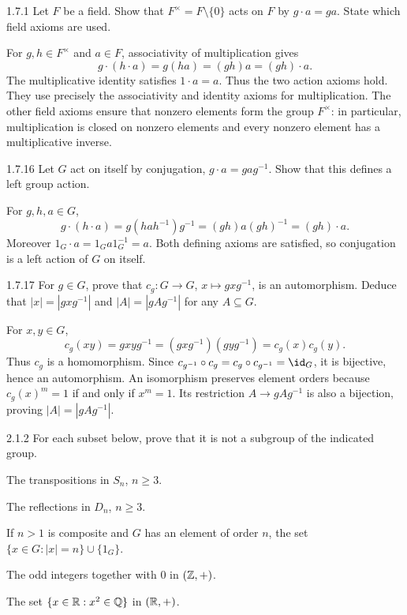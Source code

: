 \documentclass[11pt,oneside]{article}
\begin{document}

\begin{exercise}{1.7.1}
Let $F$ be a field. Show that $F^\times=F\setminus\{0\}$ acts on $F$ by $g\cdot a=ga$. State which field axioms are used.
\end{exercise}

\begin{solution}
For $g,h\in F^\times$ and $a\in F$, associativity of multiplication gives
\[
 g\cdot(h\cdot a)=g(ha)=(gh)a=(gh)\cdot a.
\]
The multiplicative identity satisfies $1\cdot a=a$. Thus the two action axioms hold. They use precisely the associativity and identity axioms for multiplication. The other field axioms ensure that nonzero elements form the group $F^\times$: in particular, multiplication is closed on nonzero elements and every nonzero element has a multiplicative inverse.
\end{solution}

\begin{exercise}{1.7.16}
Let $G$ act on itself by conjugation, $g\cdot a=gag^{-1}$. Show that this defines a left group action.
\end{exercise}

\begin{solution}
For $g,h,a\in G$,
\[
 g\cdot(h\cdot a)=g(hah^{-1})g^{-1}=(gh)a(gh)^{-1}=(gh)\cdot a.
\]
Moreover $1_G\cdot a=1_Ga1_G^{-1}=a$. Both defining axioms are satisfied, so conjugation is a left action of $G$ on itself.
\end{solution}

\begin{exercise}{1.7.17}
For $g\in G$, prove that $c_g:G\to G$, $x\mapsto gxg^{-1}$, is an automorphism. Deduce that $|x|=|gxg^{-1}|$ and $|A|=|gAg^{-1}|$ for any $A\subseteq G$.
\end{exercise}

\begin{solution}
For $x,y\in G$,
\[
 c_g(xy)=gxyg^{-1}=(gxg^{-1})(gyg^{-1})=c_g(x)c_g(y).
\]
Thus $c_g$ is a homomorphism. Since $c_{g^{-1}}\circ c_g=c_g\circ c_{g^{-1}}=\id_G$, it is bijective, hence an automorphism. An isomorphism preserves element orders because $c_g(x)^m=1$ if and only if $x^m=1$. Its restriction $A\to gAg^{-1}$ is also a bijection, proving $|A|=|gAg^{-1}|$.
\end{solution}

\begin{exercise}{2.1.2}
For each subset below, prove that it is not a subgroup of the indicated group.
\begin{exercisesubparts}
\item The transpositions in $S_n$, $n\ge3$.
\item The reflections in $D_n$, $n\ge3$.
\item If $n>1$ is composite and $G$ has an element of order $n$, the set $\{x\in G:|x|=n\}\cup\{1_G\}$.
\item The odd integers together with $0$ in $(\mathbb{Z},+)$.
\item The set $\{x\in\mathbb{R}:x^2\in\mathbb{Q}\}$ in $(\mathbb{R},+)$.
\end{exercisesubparts}
\end{exercise}
\end{document}
